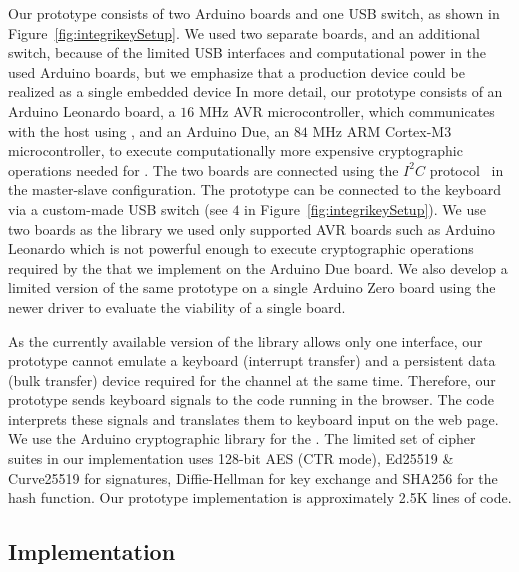 Our \device prototype consists of two Arduino boards and one USB switch, as shown in Figure~\ref{fig:integrikeySetup}. We used two separate boards, and an additional switch, because of the limited USB interfaces and computational power in the used Arduino boards, but we emphasize that a production device could be realized as a single embedded device
In more detail, our \device prototype consists of an Arduino Leonardo board, a $16$ MHz AVR microcontroller, which communicates with the host using \webusb, and an Arduino Due, an $84$ MHz ARM Cortex-M3 microcontroller, to execute computationally more expensive cryptographic operations needed for \tls. The two boards are connected using the $I^2C$ protocol~\cite{i2c} in the master-slave configuration. The prototype can be connected to the keyboard via a custom-made USB switch (see $4$ in Figure~\ref{fig:integrikeySetup}). We use two boards as the \webusb library we used only supported AVR boards such as Arduino Leonardo which is not powerful enough to execute cryptographic operations required by the \tls that we implement on the Arduino Due board. We also develop a limited version of the same prototype on a single Arduino Zero board using the newer driver to evaluate the viability of a single board.

As the currently available version of the \webusb library \cite{webusb} allows only one \usb interface, our prototype cannot emulate a keyboard (interrupt transfer) and a persistent data (bulk transfer) device required for the \tls channel at the same time. Therefore, our prototype sends keyboard signals to the \js code running in the browser. The \js code interprets these signals and translates them to keyboard input on the web page.
We use the Arduino cryptographic library for the \tls. The limited set of cipher suites in our \tls implementation uses 128-bit AES (CTR mode), Ed25519 \& Curve25519 for signatures, Diffie-Hellman for key exchange and SHA256 for the hash function. Our prototype implementation is approximately 2.5K lines of code. 


\subsection{\server Implementation} 

